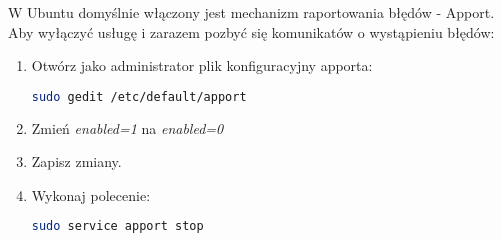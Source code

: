 W Ubuntu domyślnie włączony jest mechanizm raportowania błędów - Apport. Aby wyłączyć usługę i zarazem pozbyć się komunikatów o wystąpieniu błędów:
\begin{enumerate}
\item Otwórz jako administrator plik konfiguracyjny apporta:
\begin{lstlisting}[language=bash]
sudo gedit /etc/default/apport
\end{lstlisting}
\item Zmień \textit{enabled=1} na \textit{enabled=0}
\item Zapisz zmiany.
\item Wykonaj polecenie:
\begin{lstlisting}[language=bash]
sudo service apport stop
\end{lstlisting}
\end{enumerate}
